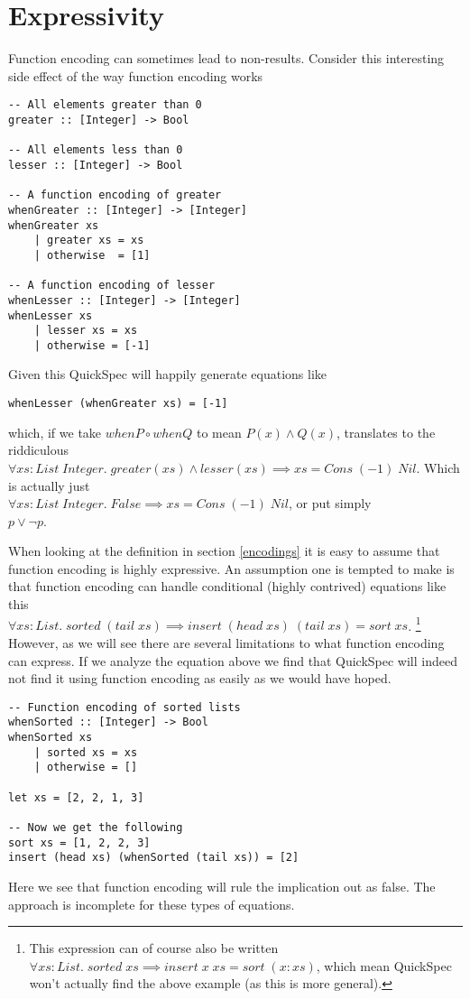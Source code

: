 \section{Expressivity}

Function encoding can sometimes lead to non-results.
Consider this interesting side effect
of the way function encoding works
\begin{verbatim}-- All elements greater than 0
greater :: [Integer] -> Bool

-- All elements less than 0 
lesser :: [Integer] -> Bool

-- A function encoding of greater
whenGreater :: [Integer] -> [Integer]
whenGreater xs
    | greater xs = xs
    | otherwise  = [1]

-- A function encoding of lesser 
whenLesser :: [Integer] -> [Integer]
whenLesser xs
    | lesser xs = xs
    | otherwise = [-1]\end{verbatim}
Given this QuickSpec will happily generate equations like
\begin{verbatim}whenLesser (whenGreater xs) = [-1]\end{verbatim}
which, if we take $whenP\circ whenQ$ to mean $P(x)\wedge Q(x)$,  translates to the riddiculous\\
$\forall xs : List\; Integer.\; greater(xs)\wedge lesser(xs)\implies xs = Cons\; (-1)\; Nil$.
Which is actually just\\$\forall xs : List\; Integer.\; False\implies xs = Cons\; (-1)\; Nil$,
or put simply\\$p\vee \neg p$.

When looking at the definition in 
section \ref{encodings} it is easy to assume
that function encoding is highly expressive.
An assumption one is tempted to make is that
function encoding can handle conditional (highly contrived)
equations like this\\
$\forall xs : List.\;sorted\;(tail\; xs) \implies insert\;(head\;xs)\;(tail\;xs)=sort\;xs$.
\footnote{This expression can of course also be written
$\forall xs : List.\;sorted\;xs \implies insert\;x\;xs=sort\;(x:xs)$,
which mean QuickSpec won't actually find the above example (as this is more general).}
However, as we will see there are several limitations to what function encoding can express.
If we analyze the equation above we find that QuickSpec will indeed not find it
using function encoding as easily as we would have hoped.
\begin{verbatim}-- Function encoding of sorted lists
whenSorted :: [Integer] -> Bool
whenSorted xs
    | sorted xs = xs
    | otherwise = []

let xs = [2, 2, 1, 3]

-- Now we get the following
sort xs = [1, 2, 2, 3]
insert (head xs) (whenSorted (tail xs)) = [2]\end{verbatim}
Here we see that function encoding will rule the implication out as false. The approach is
incomplete for these types of equations.

